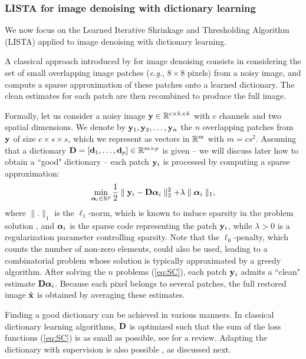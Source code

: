 \subsubsection{LISTA for image denoising with dictionary learning}

We now focus on the Learned Iterative Shrinkage and Thresholding Algorithm (LISTA) applied to image denoising with dictionary learning.

A classical approach introduced by \cite{elad_image_2006} for image denoising consists in considering the set of small overlapping image patches (\emph{e.g.}, $8 \times 8$ pixels) from a noisy image, and compute a sparse approximation of these patches onto a learned dictionary.
The clean estimates for each patch are then recombined to produce the full image.

Formally, let us consider a noisy image $\mathbf y \in \mathbb R^{c \times h \times h}$ with $c$ channels and two spatial dimensions.
We denote by $\mathbf y_1, \mathbf y_2, \ldots, \mathbf y_n$ the $n$ overlapping patches from $\mathbf y$ of size $c \times s \times s$, which we represent as vectors in $\mathbb R^{m}$ with $m = c s^2$.
Assuming that a dictionary $\mathbf D = \left[\mathbf d_1, \ldots, \mathbf d_p\right] \in \mathbb R^{m \times p}$ is given -- we will discuss later how to obtain a ``good" dictionary -- each patch $\mathbf y_i$ is processed by computing a sparse approximation:
\begin{equation}
\label{eq:SC}
    \min_{\boldsymbol \alpha_i \in \mathbb R^p} \frac{1}{2} \parallel \mathbf y_i - \mathbf D \boldsymbol \alpha_i \parallel_2^2 + \lambda \parallel \boldsymbol \alpha_i \parallel_1,
\end{equation}
where $\parallel . \parallel_1$ is the $\ell_1$-norm, which is known to induce sparsity in the problem solution \cite{mairal_sparse_2014}, and $\boldsymbol \alpha_i$ is the sparse code representing the patch $\mathbf y_i$, while $\lambda > 0$ is a regularization parameter controlling sparsity.
Note that the $\ell_0$-penalty, which counts the number of non-zero elements, could also be used, leading to a combinatorial problem whose solution is typically approximated by a greedy algorithm.
After solving the $n$ problems (\ref{eq:SC}), each patch $\mathbf y_i$ admits a ``clean" estimate $\mathbf D \boldsymbol \alpha_i$.
Because each pixel belongs to several patches, the full restored image $\hat{\mathbf x}$ is obtained by averaging these estimates.

Finding a good dictionary can be achieved in various manners.
In classical dictionary learning algorithms, $\mathbf D$ is optimized such that the sum of the loss functions (\ref{eq:SC}) is as small as possible, see \cite{mairal_sparse_2014} for a review.
Adapting the dictionary with supervision is also possible \cite{mairal_task-driven_2012}, as discussed next.


